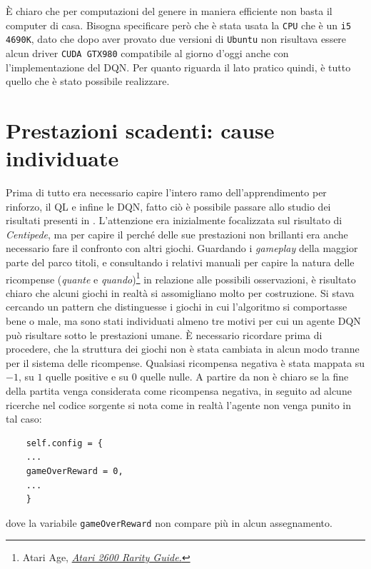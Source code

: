 \documentclass[twoside,twocolumn,10pt]{extarticle}
\theoremstyle{definition}
\begin{document}
		È chiaro che per computazioni del genere in maniera efficiente non basta il computer di casa. Bisogna specificare però che è stata usata la \texttt{CPU} che è un \texttt{i5 4690K}, dato che dopo aver provato due versioni di \texttt{Ubuntu} non risultava essere alcun driver \texttt{CUDA GTX980} compatibile al giorno d'oggi anche con l'implementazione del DQN. Per quanto riguarda il lato pratico quindi, è tutto quello che è stato possibile realizzare.
		
\section{Prestazioni scadenti: cause individuate}\label{sec:no}
	Prima di tutto era necessario capire l'intero ramo dell'apprendimento per rinforzo, il QL e infine le DQN, fatto ciò è possibile passare allo studio dei risultati presenti in \cite{bib:dqn}. L'attenzione era inizialmente focalizzata sul risultato di \textit{Centipede}, ma per capire il perché delle sue prestazioni non brillanti era anche necessario fare il confronto con altri giochi. Guardando i \textit{gameplay} della maggior parte del parco titoli, e consultando i relativi manuali per capire la natura delle ricompense (\textit{quante} e \textit{quando})\footnote{Atari Age, \emph{\href{https://atariage.com/software_search.php?SystemID=2600}{Atari 2600 Rarity Guide.}}} in relazione alle possibili osservazioni, è risultato chiaro che alcuni giochi in realtà si assomigliano molto per costruzione. Si stava cercando un pattern che distinguesse i giochi in cui l'algoritmo si comportasse bene o male, ma sono stati individuati almeno tre motivi per cui un agente DQN può risultare sotto le prestazioni umane. È necessario ricordare prima di procedere, che la struttura dei giochi non è stata cambiata in alcun modo tranne per il sistema delle ricompense. Qualsiasi ricompensa negativa è stata mappata su $-1$, su $1$ quelle positive e su $0$ quelle nulle. A partire da \cite{bib:dqn} non è chiaro se la fine della partita venga considerata come ricompensa negativa, in seguito ad alcune ricerche nel codice sorgente si nota come in realtà l'agente non venga punito in tal caso:
	\begin{verbatim}
	self.config = {
	...
	gameOverReward = 0,
	...
	}
	\end{verbatim}
	dove la variabile \texttt{gameOverReward} non compare più in alcun assegnamento.
\end{document}
